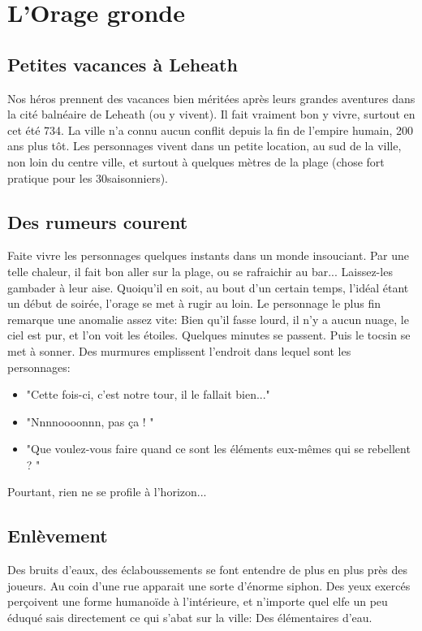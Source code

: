 \documentclass[a4paper]{article}
\begin{document}
\section{L'Orage gronde}
\subsection{Petites vacances à Leheath}
Nos héros prennent des vacances bien méritées après leurs grandes aventures dans la cité balnéaire de Leheath (ou y vivent). 
Il fait vraiment bon y vivre, surtout en cet été 734. La ville n'a connu aucun conflit depuis la fin de l'empire humain, 200 ans plus tôt.
\newline
Les personnages vivent dans un petite location, au sud de la ville, non loin du centre ville, et surtout à quelques mètres de la plage (chose fort pratique pour les 30\degre saisonniers).

\subsection{Des rumeurs courent}
Faite vivre les personnages quelques instants dans un monde insouciant. Par une telle chaleur, il fait bon aller sur la plage, ou se rafraichir au bar... Laissez-les gambader à leur aise. Quoiqu'il en soit, au bout d'un certain temps, l'idéal étant un début de soirée, l'orage se met à rugir au loin. 
\newline
Le personnage le plus fin remarque une anomalie assez vite: Bien qu'il fasse lourd, il n'y a aucun nuage, le ciel est pur, et l'on voit les étoiles. Quelques minutes se passent. Puis le tocsin se met à sonner. Des murmures emplissent l'endroit dans lequel sont les personnages:
\begin{itemize}
\item "Cette fois-ci, c'est notre tour, il le fallait bien..."
\item "Nnnnoooonnn, pas ça ! "
\item "Que voulez-vous faire quand ce sont les éléments eux-mêmes qui se rebellent ? "
\end{itemize}
Pourtant, rien ne se profile à l'horizon...

\subsection{Enlèvement}
Des bruits d'eaux, des éclaboussements se font entendre de plus en plus près des joueurs. Au coin d'une rue apparait une sorte d'énorme siphon. Des yeux exercés perçoivent une forme humanoïde à l'intérieure, et n'importe quel elfe un peu éduqué sais directement ce qui s’abat sur la ville: Des élémentaires d'eau.
\end{document}
